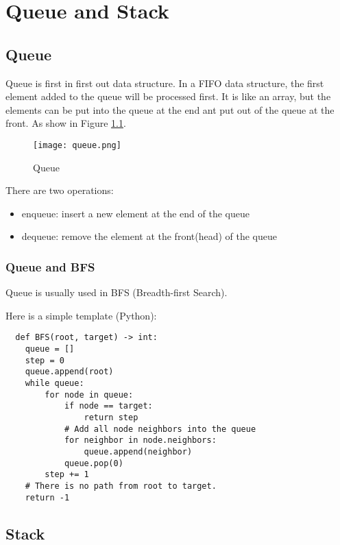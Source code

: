 
\chapter{Queue and Stack}
\label{cha:queue-stack}

\section{Queue}
\label{sec:queue}

Queue is first in first out data structure.
In a FIFO data structure, the first element added to the queue will be processed first.
It is like an array, but the elements can be put into the queue at the end ant put out of the queue at the front.
As show in Figure \ref{fig:queue}.
\begin{figure}[!ht]
  \centering
  \texttt{[image: queue.png]}
  \caption{Queue}
  \label{fig:queue}
\end{figure}

There are two operations:
\begin{itemize}
\item enqueue: insert a new element at the end of the queue
\item dequeue: remove the element at the front(head) of the queue
\end{itemize}




\subsection{Queue and BFS}
\label{sec:queue-bfs}

Queue is usually used in BFS (Breadth-first Search).

Here is a simple template (Python):
\lstset{language=Python}
\begin{lstlisting}
  def BFS(root, target) -> int:
    queue = []
    step = 0
    queue.append(root)
    while queue:
        for node in queue:
            if node == target:
                return step
            # Add all node neighbors into the queue
            for neighbor in node.neighbors:
                queue.append(neighbor)
            queue.pop(0)
        step += 1
    # There is no path from root to target.
    return -1

\end{lstlisting}

\section{Stack}
\label{sec:stack}

